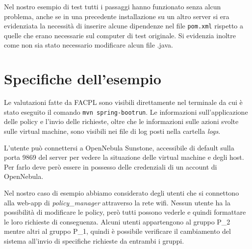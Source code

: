 Nel nostro esempio di test tutti i passaggi hanno funzionato senza alcun problema, anche se in una precedente installazione su un altro server si era evidenziata la necessità di inserire alcune dipendenze nel file \texttt{pom.xml} rispetto a quelle che erano necessarie sul computer di test originale. Si evidenzia inoltre come non sia stato necessario modificare alcun file .java.

\section{Specifiche dell'esempio}
Le valutazioni fatte da FACPL sono visibili direttamente nel terminale da cui è stato eseguito il comando \texttt{mvn spring-boot\:run}. Le informazioni sull'applicazione delle policy e l'invio delle richieste, oltre che le informazioni sulle azioni svolte sulle virtual machine, sono visibili nei file di log posti nella cartella \emph{logs}.\par
L'utente può connettersi a OpenNebula Sunstone, accessibile di default sulla porta 9869 del server per vedere la situazione delle virtual machine e degli host. Per farlo deve però essere in possesso delle credenziali di un account di OpenNebula.\par
Nel nostro caso di esempio abbiamo considerato degli utenti che si connettono alla web-app di \emph{policy\_manager} attraverso la rete wifi. Nessun utente ha la possibilità di modificare le policy, però tutti possono vederle e quindi formattare le loro richieste di conseguenza. Alcuni utenti appartengono al gruppo P\_2 mentre altri al gruppo P\_1, quindi è possibile verificare il cambiamento del sistema all'invio di specifiche richieste da entrambi i gruppi.

